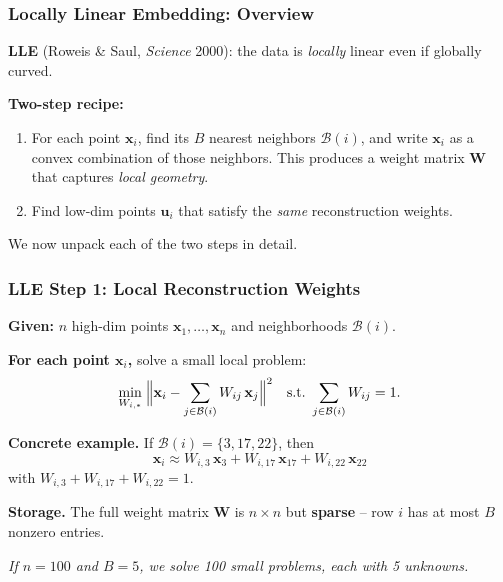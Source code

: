 \documentclass[notes,11pt, aspectratio=169]{beamer}
\newcommand{\vu}{\mathbf{u}}
\newcommand{\vx}{\mathbf{x}}
\newcommand{\vW}{\mathbf{W}}
\begin{document}
\begin{frame}
\frametitle{Locally Linear Embedding: Overview}

\textbf{LLE} (Roweis \& Saul, \emph{Science} 2000): the data is \emph{locally} linear even if globally curved.

\vspace{6pt}
\textbf{Two-step recipe:}
\begin{enumerate}
    \item For each point $\vx_i$, find its $B$ nearest neighbors $\mathcal{B}(i)$, and write $\vx_i$ as a convex combination of those neighbors. This produces a weight matrix $\vW$ that captures \emph{local geometry}.

    \vspace{4pt}
    \item Find low-dim points $\vu_i$ that satisfy the \emph{same} reconstruction weights.
\end{enumerate}

\vspace{12pt}

\vspace{8pt}
We now unpack each of the two steps in detail.
\end{frame}

\begin{frame}
\frametitle{LLE Step 1: Local Reconstruction Weights}

\textbf{Given:} $n$ high-dim points $\vx_1, \ldots, \vx_n$ and neighborhoods $\mathcal{B}(i)$.

\vspace{6pt}
\textbf{For each point $\vx_i$,} solve a small local problem:
\[
    \min_{W_{i,*}} \;\Bigl\| \vx_i - \sum_{j \in \mathcal{B}(i)} W_{ij}\, \vx_j \Bigr\|^2
    \quad \text{s.t.\ } \sum_{j \in \mathcal{B}(i)} W_{ij} = 1.
\]

\vspace{6pt}
\textbf{Concrete example.} If $\mathcal{B}(i) = \{3, 17, 22\}$, then
\[
    \vx_i \approx W_{i,3}\, \vx_3 + W_{i,17}\, \vx_{17} + W_{i,22}\, \vx_{22}
\]
with $W_{i,3} + W_{i,17} + W_{i,22} = 1$.

\vspace{8pt}
\textbf{Storage.} The full weight matrix $\vW$ is $n \times n$ but \textbf{sparse} -- row $i$ has at most $B$ nonzero entries.

\vspace{4pt}
\textit{If $n = 100$ and $B = 5$, we solve 100 small problems, each with 5 unknowns.}
\end{frame}
\end{document}
